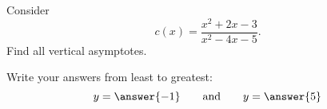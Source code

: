 \documentclass{ximera}
\author{Bart Snapp}
\begin{document}
\begin{exercise}
Consider 
\[c(x) = \frac{x^2+2 x-3}{x^2-4 x-5}.
\]
Find all vertical asymptotes.
\begin{prompt}
\begin{multipleChoice}
\end{multipleChoice}
\begin{exercise}Write your answers from least to greatest:
\[
y=\answer{-1}\qquad\text{and}\qquad y=\answer{5}
\]
\end{exercise}
\end{prompt}
\end{exercise}
\end{document}
